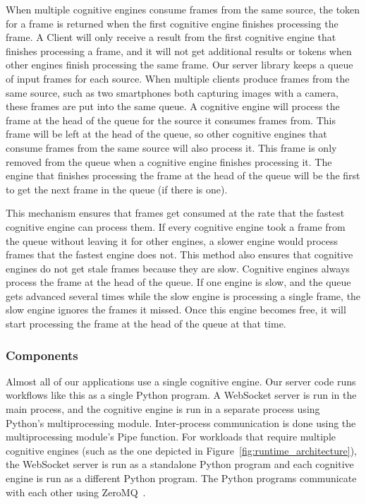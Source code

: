 When multiple cognitive engines consume frames from the same source, the token
for a frame is returned when the first cognitive engine finishes processing the
frame. A Client will only receive a result from the first cognitive engine that
finishes processing a frame, and it will not get additional results or tokens
when other engines finish processing the same frame. Our server library keeps a
queue of input frames for each source. When multiple clients produce frames from
the same source, such as two smartphones both capturing images with a camera,
these frames are put into the same queue. A cognitive engine will process the
frame at the head of the queue for the source it consumes frames from. This
frame will be left at the head of the queue, so other cognitive engines that
consume frames from the same source will also process it. This frame is only
removed from the queue when a cognitive engine finishes processing it. The
engine that finishes processing the frame at the head of the queue will be the
first to get the next frame in the queue (if there is one).

This mechanism ensures that frames get consumed at the
rate that the fastest cognitive engine can process them. If every cognitive
engine took a frame from the queue without leaving it for other engines, a
slower engine would process frames that the fastest engine does not.
This method also ensures that cognitive engines do not get stale
frames because they are slow. Cognitive engines always process the frame at the
head of the queue. If one engine is slow, and the queue gets advanced several
times while the slow engine is processing a single frame, the slow engine
ignores the frames it missed. Once this engine becomes free, it will start
processing the frame at the head of the queue at that time.

\subsubsection{Components}

Almost all of our applications use a single cognitive engine. Our server code
runs workflows like this as a single Python program. A WebSocket server is run
in the main process, and the cognitive engine is run in a separate process using
Python's multiprocessing module. Inter-process communication is done using the
multiprocessing module's Pipe function. For workloads that require multiple
cognitive engines (such as the one depicted in
Figure~\ref{fig:runtime_architecture}),
the WebSocket server is run as a standalone Python program and each cognitive
engine is run as a different Python program. The Python programs communicate
with each other using ZeroMQ~\cite{zmq}.

